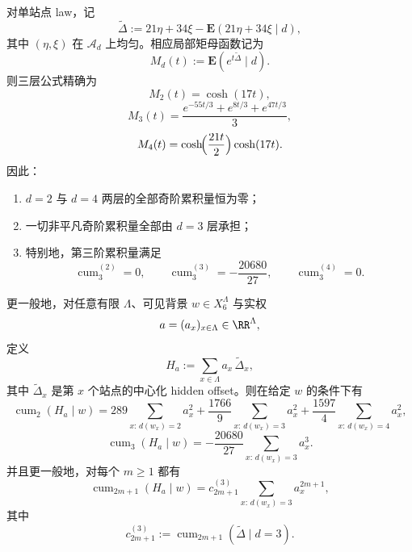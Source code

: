 \begin{theorem}\label{thm:xi-time-part9xaba-window6-odd-cumulants-supported-on-d2-slice}
对单站点 law，记
\[
\widetilde\Delta:=21\eta+34\xi-\mathbf E(21\eta+34\xi\mid d),
\]
其中 \((\eta,\xi)\) 在 \(\mathcal A_d\) 上均匀。相应局部矩母函数记为
\[
M_d(t):=\mathbf E(e^{t\widetilde\Delta}\mid d).
\]
则三层公式精确为
\[
M_2(t)=\cosh(17t),
\]
\[
M_3(t)=\frac{e^{-55t/3}+e^{8t/3}+e^{47t/3}}{3},
\]
\[
M_4(t)=\cosh\!\Bigl(\frac{21t}{2}\Bigr)\cosh(17t).
\]
因此：
\begin{enumerate}
  \item \(d=2\) 与 \(d=4\) 两层的全部奇阶累积量恒为零；
  \item 一切非平凡奇阶累积量全部由 \(d=3\) 层承担；
  \item 特别地，第三阶累积量满足
  \[
  \operatorname{cum}_3^{(2)}=0,\qquad
  \operatorname{cum}_3^{(3)}=-\frac{20680}{27},\qquad
  \operatorname{cum}_3^{(4)}=0.
  \]
\end{enumerate}

更一般地，对任意有限 \(\Lambda\)、可见背景 \(w\in X_6^\Lambda\) 与实权
\[
a=(a_x)_{x\in\Lambda}\in\RR^\Lambda,
\]
定义
\[
H_a:=\sum_{x\in\Lambda}a_x\,\widetilde\Delta_x,
\]
其中 \(\widetilde\Delta_x\) 是第 \(x\) 个站点的中心化 hidden offset。则在给定 \(w\) 的条件下有
\[
\operatorname{cum}_2(H_a\mid w)
=
289\sum_{x:\,d(w_x)=2}a_x^2
+
\frac{1766}{9}\sum_{x:\,d(w_x)=3}a_x^2
+
\frac{1597}{4}\sum_{x:\,d(w_x)=4}a_x^2,
\]
\[
\operatorname{cum}_3(H_a\mid w)
=
-\frac{20680}{27}
\sum_{x:\,d(w_x)=3}a_x^3.
\]
并且更一般地，对每个 \(m\ge 1\) 都有
\[
\operatorname{cum}_{2m+1}(H_a\mid w)
=
c_{2m+1}^{(3)}
\sum_{x:\,d(w_x)=3}a_x^{2m+1},
\]
其中
\[
c_{2m+1}^{(3)}:=\operatorname{cum}_{2m+1}(\widetilde\Delta\mid d=3).
\]
\end{theorem}
